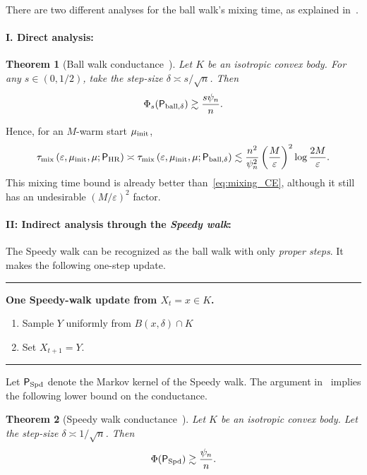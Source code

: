 \documentclass[11pt]{article}
\newtheorem{theorem}{Theorem}[section]
\theoremstyle{definition}
\theoremstyle{remark}
\newcommand{\mix}{\mathrm{mix}}
\newcommand{\HR}{\mathsf P_{\mathrm{HR}}}
\begin{document}
There are two different analyses for the ball walk's mixing time, as explained in~\cite{KookVempalaZhangInOut}. 
\paragraph{I. Direct analysis:}%
\begin{theorem}[Ball walk conductance~{\cite[Section 5]{VempalaSurvey}}]
Let $K$ be an isotropic convex body. For any $s\in (0,1/2)$, take the step-size $\delta\asymp s/\sqrt{n}$. Then 
\begin{align*}
    \Phi_s({\sf P}_{{\rm ball},\delta})\gtrsim \frac{s\psi_n}{n}.
\end{align*}
\end{theorem}
Hence, for an $M$-warm start $\mu_{\rm init}$,
\begin{align*}
    \tau_{\mix}\left(\varepsilon,\mu_{\mathrm{init}},\mu;\HR\right) \asymp \tau_{\mix}\left(\varepsilon,\mu_{\mathrm{init}},\mu;{\sf P}_{{\rm ball},\delta}\right)\lesssim \frac{n^2}{\psi_n^2} \left(\frac{M}{\varepsilon}\right)^2\log\frac{2M}{\varepsilon}.
\end{align*}
This mixing time bound is already better than~\eqref{eq:mixing_CE}, although it still has an undesirable $(M/\varepsilon)^2$ factor.

\paragraph{II: Indirect analysis through the \emph{Speedy walk}:}%
The Speedy walk can be recognized as the ball walk with only \emph{proper steps}. It makes the following one-step update.
\begin{center}
\begin{minipage}{0.86\textwidth}
\hrule
\smallskip
\textbf{One Speedy-walk update from $X_t=x\in K$.}
\begin{enumerate}[leftmargin=2em,itemsep=2pt,topsep=4pt]
\item Sample $Y$ uniformly from $B(x,\delta)\cap K$
\item Set $X_{t+1}=Y$.
\end{enumerate}
\smallskip
\hrule
\end{minipage}
\end{center}
Let ${\sf P}_{\rm Spd}$ denote the Markov kernel of the Speedy walk. The argument in~\cite{KLS97} implies the following lower bound on the conductance.
\begin{theorem}[Speedy walk conductance~\cite{KLS97}]\label{thm:Speedy}
Let $K$ be an isotropic convex body. Let the step-size $\delta\asymp 1/\sqrt{n}$. Then
\begin{align*}
    \Phi({\sf P}_{\rm Spd})\gtrsim \frac{\psi_n}{n}.
\end{align*}
\end{theorem}
\end{document}
